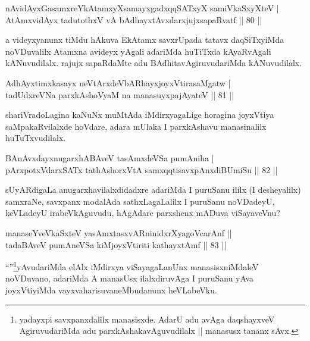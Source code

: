 
\begin{shl}
nAvidAyxGasamxreYkAtamxyXsamayxgadxqqSATxyX samiVkaSxyXteV | \\
AtAmxvidAyx tadutothxV vA bAdhayxtAvxdarxjujxsapaRvatf \hfill||  80 ||  
\end{shl}

\begin{artha}
a videyxyanunx tiMdu hAkuva EkAtamx savxrUpada tatavx daqSiTxyiMda noVDuvalilx Atamxna avideyx yAgali adariMda huTiTxda kAyaRvAgali kANuvudilalx. rajujx sapaRdaMte adu BAdhitavAgiruvudariMda kANuvudilalx.
\end{artha}


\begin{shl}
AdhAyxtimxkasayx neVtArxdeVbARhayxjoyxVtirasaMgatw | \\
tadUdxreVNa parxkAshoV\s yaM na manasuyxpajAyateV \hfill||  81 ||  
\end{shl}

\begin{artha}
shariVradoLagina kaNuNx muMtAda iMdirxyagaLige horagina  joyxVtiya saMpakaRvilalxde hoVdare, adara mUlaka I parxkAshavu manasinalilx huTuTxvudilalx.
\end{artha}

\begin{shl}
BAnAvxdayxnugarxhABAveV tasAmxdeVSa pumAniha | \\
pArxpotxV\s darxSATx tathA\s shorxVtA samxqqtisavxpAnxdiBUmiSu \hfill||  82 ||  
\end{shl}

\begin{artha}
sUyARdigaLa anugarxhavilalxdidadxre adariMda I puruSanu ililx (I desheyalilx) samxraNe, savxpanx modalAda sathxLagaLalilx I puruSanu noVDadeyU, keVLadeyU irabeVkAguvudu, hAgAdare parxshenx mADuva viSayaveVnu?
\end{artha}

\begin{shl}
manaseYveVkaSxteV yasAmxtasxvARninidxrXyagoVcarAnf ||  \\
tadaBAveV pumAneVSa kiMjoyxVtiriti kathayxtAmf \hfill ||  83 ||  
\end{shl}

\begin{artha}
``\stext''\footnote{yadayxpi savxpanxdalilx manasisxde. AdarU adu avAga daqshayxveV AgiruvudariMda adu parxkAshakavAguvudilalx || manasusx tananx sAvx.}yAvudariMda elAlx iMdirxya viSayagaLanUnx manasisxniMdaleV noVDuvano, adariMda A manasUsx ilalxdiruvAga I puruSanu yAva joyxVtiyiMda vayxvaharisuvaneMbudanunx heVLabeVku.
\end{artha}

